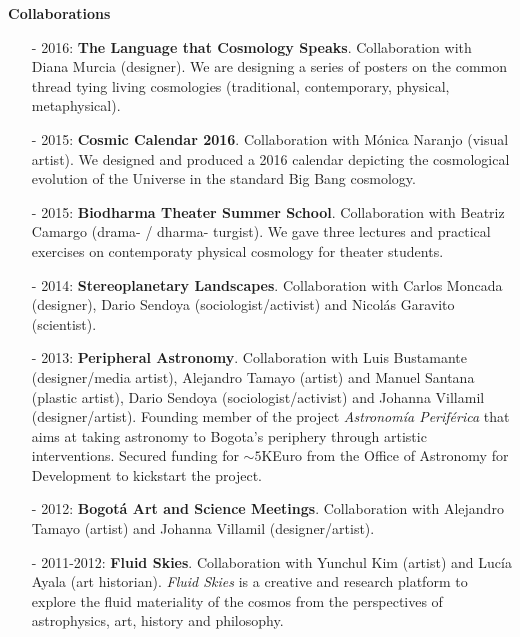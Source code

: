 \documentclass[letterpaper,11pt,onecolumn]{article}
\begin{document}
{\bf Collaborations}
\begin{itemize}
\item [-] 2016: {\bf The Language that Cosmology
  Speaks}. Collaboration with Diana Murcia (designer). We are
  designing a series of posters on the common thread tying living
  cosmologies (traditional, contemporary, physical, metaphysical). %
\item [-] 2015: {\bf Cosmic Calendar 2016}. Collaboration with M\'onica
  Naranjo (visual artist). We designed and produced a 2016 calendar
  depicting the cosmological evolution of the Universe in the standard
  Big Bang cosmology. 
\item [-] 2015: {\bf Biodharma Theater Summer School}. Collaboration
  with Beatriz Camargo (drama- / dharma- turgist). We gave three lectures and
  practical exercises on contemporaty physical cosmology for theater students.  
\item [-] 2014: {\bf Stereoplanetary Landscapes}. Collaboration with
  Carlos Moncada (designer), Dario Sendoya (sociologist/activist) and
  Nicol\'as Garavito (scientist).
\item [-] 2013: {\bf Peripheral Astronomy}. Collaboration with Luis
  Bustamante (designer/media artist), Alejandro Tamayo (artist) and Manuel
  Santana (plastic artist), Dario Sendoya (sociologist/activist) and
  Johanna Villamil (designer/artist).
  Founding member of the project \emph{Astronom\'ia
  Perif\'erica} that aims at taking astronomy to Bogota's periphery
  through artistic interventions.  Secured funding for $\sim 5$KEuro
  from the Office of Astronomy for Development to kickstart the
  project. 
\item [-] 2012: {\bf Bogot\'a Art and Science Meetings}. Collaboration
  with Alejandro Tamayo (artist) and Johanna Villamil
  (designer/artist). 
\item [-] 2011-2012: {\bf Fluid Skies}. Collaboration with Yunchul Kim
  (artist) and Luc\'ia Ayala (art historian). 
{\it Fluid Skies} is a creative and research platform to
  explore the fluid materiality of the cosmos from the perspectives of
  astrophysics, art, history and philosophy. 
\end{itemize}
\end{document}
